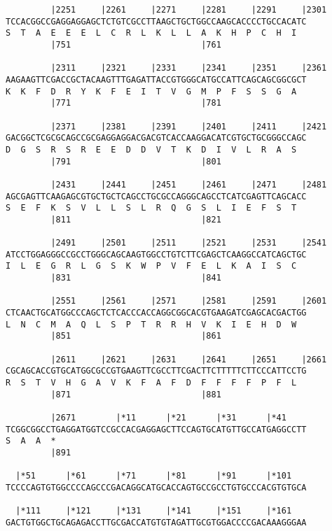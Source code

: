 \documentclass{article}
\begin{document}
\begin{Verbatim}
         |2251     |2261     |2271     |2281     |2291     |2301
TCCACGGCCGAGGAGGAGCTCTGTCGCCTTAAGCTGCTGGCCAAGCACCCCTGCCACATC
S  T  A  E  E  E  L  C  R  L  K  L  L  A  K  H  P  C  H  I  
         |751                          |761                 
  
         |2311     |2321     |2331     |2341     |2351     |2361
AAGAAGTTCGACCGCTACAAGTTTGAGATTACCGTGGGCATGCCATTCAGCAGCGGCGCT
K  K  F  D  R  Y  K  F  E  I  T  V  G  M  P  F  S  S  G  A  
         |771                          |781                 
  
         |2371     |2381     |2391     |2401     |2411     |2421
GACGGCTCGCGCAGCCGCGAGGAGGACGACGTCACCAAGGACATCGTGCTGCGGGCCAGC
D  G  S  R  S  R  E  E  D  D  V  T  K  D  I  V  L  R  A  S  
         |791                          |801                 
  
         |2431     |2441     |2451     |2461     |2471     |2481
AGCGAGTTCAAGAGCGTGCTGCTCAGCCTGCGCCAGGGCAGCCTCATCGAGTTCAGCACC
S  E  F  K  S  V  L  L  S  L  R  Q  G  S  L  I  E  F  S  T  
         |811                          |821                 
  
         |2491     |2501     |2511     |2521     |2531     |2541
ATCCTGGAGGGCCGCCTGGGCAGCAAGTGGCCTGTCTTCGAGCTCAAGGCCATCAGCTGC
I  L  E  G  R  L  G  S  K  W  P  V  F  E  L  K  A  I  S  C  
         |831                          |841                 
  
         |2551     |2561     |2571     |2581     |2591     |2601
CTCAACTGCATGGCCCAGCTCTCACCCACCAGGCGGCACGTGAAGATCGAGCACGACTGG
L  N  C  M  A  Q  L  S  P  T  R  R  H  V  K  I  E  H  D  W  
         |851                          |861                 
  
         |2611     |2621     |2631     |2641     |2651     |2661
CGCAGCACCGTGCATGGCGCCGTGAAGTTCGCCTTCGACTTCTTTTTCTTCCCATTCCTG
R  S  T  V  H  G  A  V  K  F  A  F  D  F  F  F  F  P  F  L  
         |871                          |881                 
  
         |2671        |*11      |*21      |*31      |*41    
TCGGCGGCCTGAGGATGGTCCGCCACGAGGAGCTTCCAGTGCATGTTGCCATGAGGCCTT
S  A  A  *   
         |891                                               
  
  |*51      |*61      |*71      |*81      |*91      |*101   
TCCCCAGTGTGGCCCCAGCCCGACAGGCATGCACCAGTGCCGCCTGTGCCCACGTGTGCA
                                                            
  |*111     |*121     |*131     |*141     |*151     |*161   
GACTGTGGCTGCAGAGACCTTGCGACCATGTGTAGATTGCGTGGACCCCGACAAAGGGAA
                                                            

\end{Verbatim}
\end{document}
